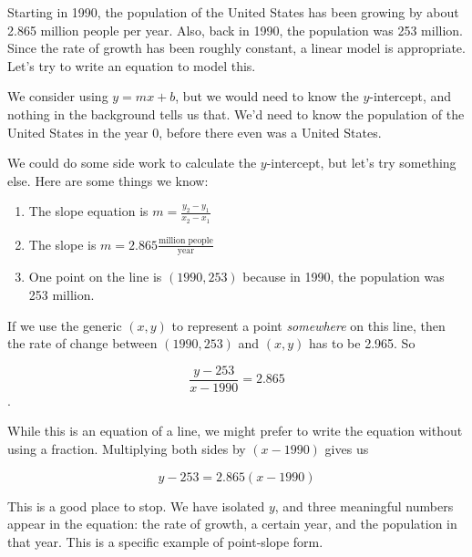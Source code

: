 \documentclass[nooutcomes]{ximera}
\begin{document}
\begin{example}
Starting in 1990, the population of the United States has been growing by about 2.865  million people per year. Also, back in 1990, the population was 253 million. Since the rate of growth has been roughly constant, a linear model is appropriate. Let's try to write an equation to model this.

\begin{explanation}
We consider using $y=mx+b$, but we would need to know the $y$-intercept, and nothing in the background tells us that. We'd need to know the population of the United States in the year 0, before there even was a United States.

We could do some side work to calculate the $y$-intercept, but let's try something else. Here are some things we know:
\begin{enumerate}
\item The slope equation is $m=\frac{y_2-y_1}{x_2-x_1}$
\item The slope is $m=2.865 \frac{\text{million people}}{\text{year}}$
\item One point on the line is $(1990,253)$ because in 1990, the population was 253 million.
\end{enumerate}

If we use the generic $(x,y)$ to represent a point \textit{somewhere} on this line, then the rate of change between $(1990,253)$ and $(x,y)$  has to be 2.965.  So

$$\frac{y-253}{x-1990}=2.865$$.

While this is an equation of a line, we might prefer to write the equation without using a fraction.  Multiplying both sides by $(x-1990)$ gives us

$$y-253=2.865(x-1990)$$

This is a good place to stop. We have isolated $y$, and three meaningful numbers appear in the equation: the rate of growth, a certain year, and the population in that year. This is a specific example of point-slope form. 
\end{explanation}
\end{example}
\end{document}
